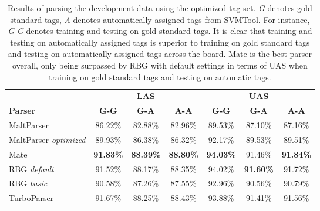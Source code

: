 \documentclass[a4paper,12pt,english]{book}
\begin{document}
\begin{table}
    \centering
    \smaller[0.5]
    \begin{tabular}{@{}lcccccc@{}}
        \toprule
        & \multicolumn{3}{c}{\textbf{LAS}}
        & \multicolumn{3}{c}{\textbf{UAS}} \\
        \cmidrule(lr){2-4}
        \cmidrule(lr){5-7}
        \textbf{Parser} & \textbf{G-G} & \textbf{G-A} & \textbf{A-A} &
        \textbf{G-G} & \textbf{G-A} & \textbf{A-A} \\
        \midrule
        MaltParser & 86.22\% & 82.88\% & 82.96\% & 89.53\% & 87.10\% & 87.16\%
        \\
        MaltParser \emph{optimized} & 89.93\% & 86.38\% & 86.32\% & 92.17\% &
        89.53\% & 89.51\% \\
        Mate & \textbf{91.83\%} & \textbf{88.39\%} & \textbf{88.80\%} &
        \textbf{94.03\%} & 91.46\% & \textbf{91.84\%} \\
        RBG \emph{default} & 91.52\% & 88.17\% & 88.35\% & 94.02\% &
        \textbf{91.60\%} & 91.72\% \\
        RBG \emph{basic} & 90.58\% & 87.26\% & 87.55\% & 92.96\% & 90.56\% &
        90.79\% \\
        TurboParser & 91.67\% & 88.25\% & 88.43\% & 93.88\% & 91.41\% & 91.56\%
        \\
        \bottomrule
    \end{tabular}
    \caption{Results of parsing the development data using the optimized tag
        set. \emph{G} denotes gold standard tags, \emph{A} denotes
        automatically assigned tags from SVMTool. For instance, \emph{G-G}
        denotes training and testing on gold standard tags. It is clear that
        training and testing on automatically assigned tags is superior to
        training on gold standard tags and testing on automatically assigned
        tags across the board. Mate is the best parser overall, only being
        surpassed by RBG with default settings in terms of UAS when training on
        gold standard tags and testing on automatic tags.}
    \label{parsereval}
\end{table}
\end{document}
